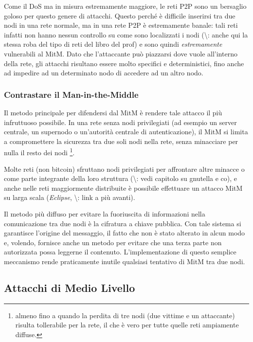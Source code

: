 Come il DoS ma in misura estremamente maggiore, le reti P2P sono un
bersaglio goloso per questo genere di attacchi. Questo perché è
difficile inserirsi tra due nodi in una rete normale, ma in una rete P2P
è estremamente banale: tali reti infatti non hanno nessun controllo su
come sono localizzati i nodi (\textbackslash{}\TODO: anche qui la stessa
roba del tipo di reti del libro del prof) e sono quindi
\emph{estremamente} vulnerabili al MitM. Dato che l'attaccante può
piazzarsi dove vuole all'interno della rete, gli attacchi risultano
essere molto specifici e deterministici, fino anche ad impedire ad un
determinato nodo di accedere ad un altro nodo.

\subsubsection{Contrastare il
Man-in-the-Middle}\label{contrastare-il-man-in-the-middle}

Il metodo principale per difendersi dal MitM è rendere tale attacco il
più infruttuoso possibile. In una rete senza nodi privilegiati (ad
esempio un server centrale, un supernodo o un'autorità centrale di
autenticazione), il MitM si limita a compromettere la sicurezza tra due
soli nodi nella rete, senza minacciare per nulla il resto dei nodi
\footnote{almeno fino a quando la perdita di tre nodi (due vittime e un
  attaccante) risulta tollerabile per la rete, il che è vero per tutte
  quelle reti ampiamente diffuse.}.

Molte reti (non bitcoin) sfruttano nodi privilegiati per affrontare
altre minacce o come parte integrante della loro struttura
(\textbackslash{}\TODO: vedi capitolo su gnutella e co), e anche nelle
reti maggiormente distribuite è possibile effettuare un attacco MitM su
larga scala (\emph{Eclipse}, \textbackslash{}\TODO: link a più avanti).

Il metodo più diffuso per evitare la fuoriuscita di informazioni nella
comunicazione tra due nodi è la cifratura a chiave pubblica. Con tale
sistema si garantisce l'origine del messaggio, il fatto che non è stato
alterato in alcun modo e, volendo, fornisce anche un metodo per evitare
che una terza parte non autorizzata possa leggerne il contenuto.
L'implementazione di questo semplice meccanismo rende praticamente
inutile qualsiasi tentativo di MitM tra due nodi.

\subsection{Attacchi di Medio Livello}\label{attacchi-di-medio-livello}

